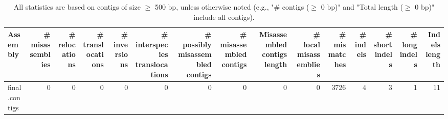 \documentclass[12pt,a4paper]{article}
\begin{document}
\begin{table}[ht]
\begin{center}
\caption{All statistics are based on contigs of size $\geq$ 500 bp, unless otherwise noted (e.g., "\# contigs ($\geq$ 0 bp)" and "Total length ($\geq$ 0 bp)" include all contigs).}
\begin{tabular}{|l*{14}{|r}|}
\hline
Assembly & \# misassemblies &     \# relocations &     \# translocations &     \# inversions &     \# interspecies translocations & \# possibly misassembled contigs & \# misassembled contigs & Misassembled contigs length & \# local misassemblies & \# mismatches & \# indels &     \# short indels &     \# long indels & Indels length \\ \hline
final.contigs & 0 & 0 & 0 & 0 & 0 & 0 & 0 & 0 & 0 & 3726 & 4 & 3 & 1 & 11 \\ \hline
\end{tabular}
\end{center}
\end{table}
\end{document}

